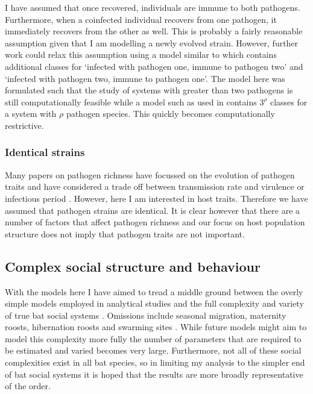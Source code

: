 I have assumed that once recovered, individuals are immune to both pathogens. 
Furthermore, when a coinfected individual recovers from one pathogen, it immediately recovers from the other as well.
This is probably a fairly reasonable assumption given that I am modelling a newly evolved strain.
However, further work could relax this assumption using a model similar to \cite{poletto2015characterising} which contains additional classes for `infected with pathogen one, immune to pathogen two' and `infected with pathogen two, immune to pathogen one'.
The model here was formulated such that the study of systems with greater than two pathogens is still computationally feasible while a model such as used in \cite{poletto2015characterising} contains $3^\rho$ classes for a system with $\rho$ pathogen species.
This quickly becomes computationally restrictive.

\subsubsection{Identical strains}

Many papers on pathogen richness have focussed on the evolution of pathogen traits and have considered a trade off between transmission rate and virulence \cite{nowak1994superinfection, nowak1994superinfection} or infectious period \cite{poletto2013host}.
However, here I am interested in host traits.
Therefore we have assumed that pathogen strains are identical.
It is clear however that there are a number of factors that affect pathogen richness and our focus on host population structure does not imply that pathogen traits are not important.

\subsection{Complex social structure and behaviour}

With the models here I have aimed to tread a middle ground between the overly simple models employed in analytical studies \cite{allen2004sis} and the full complexity and variety of true bat social systems \cite{kerth2008causes}.
Omissions include seasonal migration,  maternity roosts, hibernation roosts and swarming sites \cite{kerth2008causes, fleming2003ecology, richter2008first, cryan2014continental}. 
While future models might aim to model this complexity more fully the number of parameters that are required to be estimated and varied becomes very large.
Furthermore, not all of these social complexities exist in all bat species, so in limiting my analysis to the simpler end of bat social systems it is hoped that the results are more broadly representative of the order.

